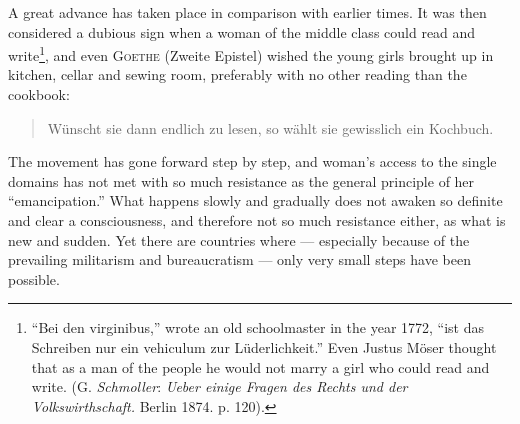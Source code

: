 \documentclass[12pt,a4paper,openany]{book}
\newcommand{\opage}[1]{\marginnote{\footnotesize\textit{[#1]}}}
\begin{document}
A great advance has taken place in comparison with earlier times. It was then considered a dubious sign when a woman of
the middle class could read and write\footnote[2]{``Bei den virginibus,'' wrote an old schoolmaster in the year 1772,
``ist das Schreiben nur ein vehiculum zur Lüderlichkeit.'' Even Justus Möser thought that as a man of the people he
would not marry a girl who could read and write. (G. \emph{Schmoller}: \textit{Ueber einige Fragen des Rechts und der
Volkswirthschaft.} Berlin 1874. p. 120).}, and even \textsc{Goethe} (Zweite Epistel) wished the young girls brought up
in kitchen, cellar and sewing room, preferably with no other reading than the cookbook:
\begin{quote}
Wünscht sie dann endlich zu lesen, so wählt sie gewisslich ein Kochbuch.
\end{quote}
The movement has gone forward step by step, and woman's access to the single domains has not met with so much resistance
as the general principle of her ``emancipation.'' What happens slowly and gradually does not awaken so definite and
clear a consciousness, and therefore not so much
\opage{324}resistance either, as what is new and sudden. Yet there are countries where --- especially because of the
prevailing militarism and bureaucratism --- only very small steps have been possible.
\end{document}
